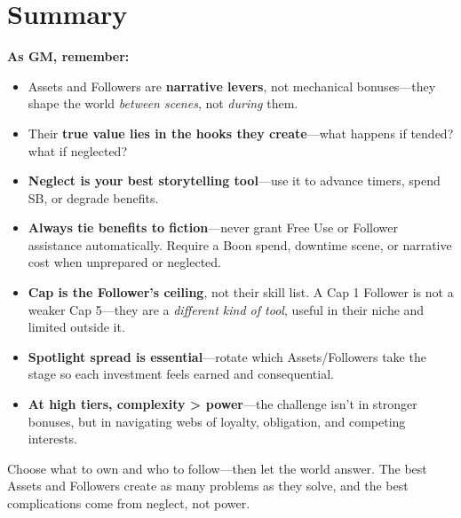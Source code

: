 \section{Summary}
\label{sec:summary-assets-followers}
\textbf{As GM, remember:}  
\begin{itemize}
  \item Assets and Followers are \textbf{narrative levers}, not mechanical bonuses---they shape the world \emph{between scenes}, not \emph{during} them.  
  \item Their \textbf{true value lies in the hooks they create}---what happens if tended? what if neglected?  
  \item \textbf{Neglect is your best storytelling tool}---use it to advance timers, spend SB, or degrade benefits.  
  \item \textbf{Always tie benefits to fiction}---never grant Free Use or Follower assistance automatically. Require a Boon spend, downtime scene, or narrative cost when unprepared or neglected.  
  \item \textbf{Cap is the Follower's ceiling}, not their skill list. A Cap 1 Follower is not a weaker Cap 5---they are a \emph{different kind of tool}, useful in their niche and limited outside it.  
  \item \textbf{Spotlight spread is essential}---rotate which Assets/Followers take the stage so each investment feels earned and consequential.  
  \item \textbf{At high tiers, complexity > power}---the challenge isn't in stronger bonuses, but in navigating webs of loyalty, obligation, and competing interests.  
\end{itemize}
Choose what to own and who to follow---then let the world answer. The best Assets and Followers create as many problems as they solve, and the best complications come from neglect, not power.  

